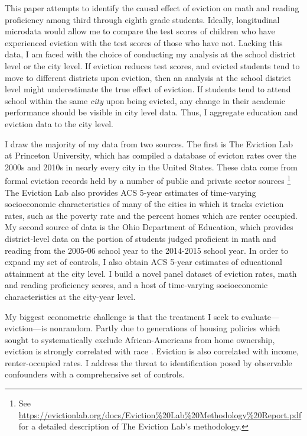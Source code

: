 \documentclass[12pt]{article}
\begin{document}
This paper attempts to identify the causal effect of eviction on math and reading proficiency among third through eighth grade students. Ideally, longitudinal microdata would allow me to compare the test scores of children who have experienced eviction with the test scores of those who have not. Lacking this data, I am faced with the choice of conducting my analysis at the school district level or the city level. If eviction reduces test scores, and evicted students tend to move to different districts upon eviction, then an analysis at the school district level might underestimate the true effect of eviction. If students tend to attend school within the same \textit{city} upon being evicted, any change in their academic performance should be visible in city level data. Thus, I aggregate education and eviction data to the city level.

I draw the majority of my data from two sources. The first is The Eviction Lab at Princeton University, which has compiled a database of evicton rates over the 2000s and 2010s in nearly every city in the United States\citep{desmond_eviction_2018}. These data come from formal eviction records held by a number of public and private sector sources \footnote{See \url{https://evictionlab.org/docs/Eviction\%20Lab\%20Methodology\%20Report.pdf} for a detailed description of The Eviction Lab's methodology.} The Eviction Lab also provides ACS 5-year estimates of time-varying socioeconomic characteristics of many of the cities in which it tracks eviction rates, such as the poverty rate and the percent homes which are renter occupied. My second source of data is the Ohio Department of Education, which provides district-level data on the portion of students judged proficient in math and reading from the 2005-06 school year to the 2014-2015 school year. In order to expand my set of controls, I also obtain ACS 5-year estimates of educational attainment at the city level. I build a novel panel dataset of eviction rates, math and reading proficiency scores, and a host of time-varying socioeconomic characteristics at the city-year level.

My biggest econometric challenge is that the treatment I seek to evaluate—eviction—is nonrandom. Partly due to generations of housing policies which sought to systematically exclude African-Americans from home ownership, eviction is strongly correlated with race \citep{rothstein_color_2017}. Eviction is also correlated with income, renter-occupied rates. I address the threat to identification posed by observable confounders with a comprehensive set of controls.
\end{document}
